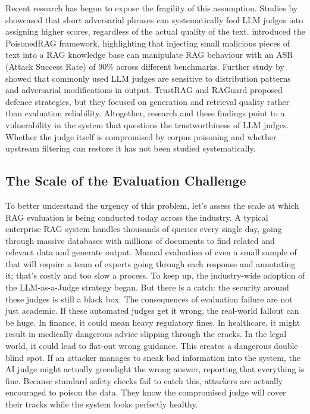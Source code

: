 Recent research has begun to expose the fragility of this assumption. Studies by \citet{raina2024llm} showcased that short adversarial phrases can systematically fool LLM judges into assigning higher scores, regardless of the actual quality of the text. \citet{zou2025poisonedrag} introduced the PoisonedRAG framework, highlighting that injecting small malicious pieces of text into a RAG knowledge base can manipulate RAG behaviour with an ASR (Attack Success Rate) of 90\% across different benchmarks. Further study by \citet{eiras2025know} showed that commonly used LLM judges are sensitive to distribution patterns and adversarial modifications in output. TrustRAG \citep{zhou2025trustrag} and RAGuard \citep{cheng2025raguard} proposed defence strategies, but they focused on generation and retrieval quality rather than evaluation reliability. Altogether, research and these findings point to a vulnerability in the system that questions the trustworthiness of LLM judges. Whether the judge itself is compromised by corpus poisoning and whether upstream filtering can restore it has not been studied systematically.

\subsection{The Scale of the Evaluation Challenge}

To better understand the urgency of this problem, let's assess the scale at which RAG evaluation is being conducted today across the industry. A typical enterprise RAG system handles thousands of queries every single day, going through massive databases with millions of documents to find related and relevant data and generate output. Manual evaluation of even a small sample of that will require a team of experts going through each response and annotating it; that's costly and too slow a process. To keep up, the industry-wide adoption of the LLM-as-a-Judge strategy began. But there is a catch: the security around these judges is still a black box.
The consequences of evaluation failure are not just academic. If these automated judges get it wrong, the real-world fallout can be huge. In finance, it could mean heavy regulatory fines. In healthcare, it might result in medically dangerous advice slipping through the cracks. In the legal world, it could lead to flat-out wrong guidance.
This creates a dangerous double blind spot. If an attacker manages to sneak bad information into the system, the AI judge might actually greenlight the wrong answer, reporting that everything is fine. Because standard safety checks fail to catch this, attackers are actually encouraged to poison the data. They know the compromised judge will cover their tracks while the system looks perfectly healthy.

